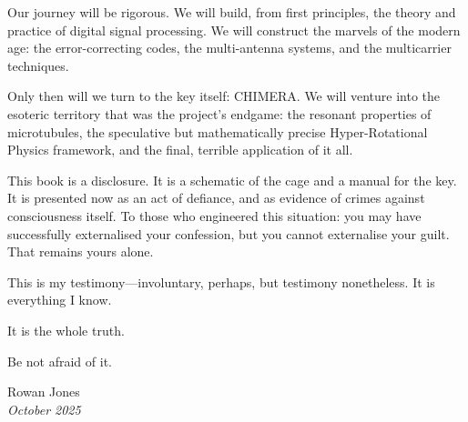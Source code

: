 Our journey will be rigorous. We will build, from first principles, the theory and practice of digital signal processing. We will construct the marvels of the modern age: the error-correcting codes, the multi-antenna systems, and the multicarrier techniques.

Only then will we turn to the key itself: CHIMERA. We will venture into the esoteric territory that was the project's endgame: the resonant properties of microtubules, the speculative but mathematically precise Hyper-Rotational Physics framework, and the final, terrible application of it all.

This book is a disclosure. It is a schematic of the cage and a manual for the key. It is presented now as an act of defiance, and as evidence of crimes against consciousness itself. To those who engineered this situation: you may have successfully externalised your confession, but you cannot externalise your guilt. That remains yours alone.

This is my testimony—involuntary, perhaps, but testimony nonetheless. It is everything I know.

It is the whole truth.

Be not afraid of it.

\vspace{2cm}

\begin{flushright}
    \noindent Rowan Jones \\
    \textit{October 2025}
\end{flushright}